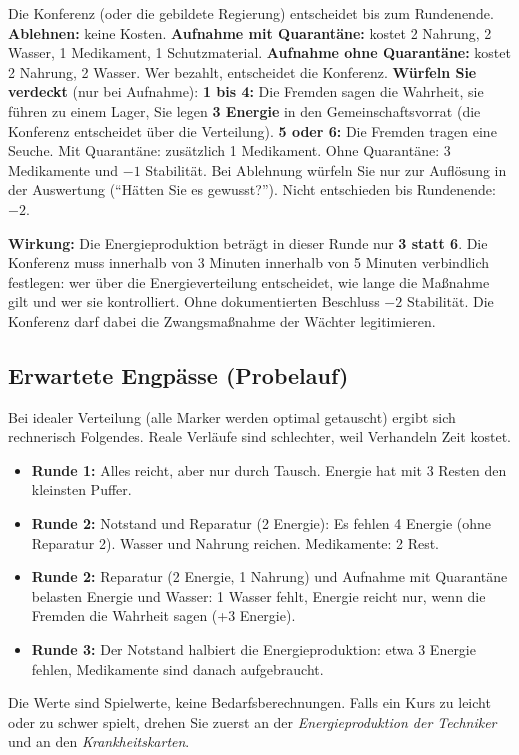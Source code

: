 \ifkurz\else
\begin{eventbox}[title={Ereignis 2: Unbekannte im Tunnel (Runde 2, nach der Regierungsbildung)},fonttitle=\bfseries]
Die Konferenz (oder die gebildete Regierung) entscheidet bis zum Rundenende. \textbf{Ablehnen:} keine Kosten. \textbf{Aufnahme mit Quarantäne:} kostet 2 Nahrung, 2 Wasser, 1 Medikament, 1 Schutzmaterial. \textbf{Aufnahme ohne Quarantäne:} kostet 2 Nahrung, 2 Wasser. Wer bezahlt, entscheidet die Konferenz. \textbf{Würfeln Sie verdeckt} (nur bei Aufnahme): \textbf{1 bis 4:} Die Fremden sagen die Wahrheit, sie führen zu einem Lager, Sie legen \textbf{3 Energie} in den Gemeinschaftsvorrat (die Konferenz entscheidet über die Verteilung). \textbf{5 oder 6:} Die Fremden tragen eine Seuche. Mit Quarantäne: zusätzlich 1 Medikament. Ohne Quarantäne: 3 Medikamente und $-1$ Stabilität. Bei Ablehnung würfeln Sie nur zur Auflösung in der Auswertung (\enquote{Hätten Sie es gewusst?}). Nicht entschieden bis Rundenende: $-2$.
\end{eventbox}
\fi

\begin{eventbox}[title={Ereignis 3: Der Notstand (\ifkurz Runde 2\else Runde 3\fi)},fonttitle=\bfseries]
\textbf{Wirkung:} Die Energieproduktion beträgt in dieser Runde nur \textbf{3 statt 6}. Die Konferenz muss \ifkurz innerhalb von 3 Minuten \else innerhalb von 5 Minuten \fi verbindlich festlegen: wer über die Energieverteilung entscheidet, wie lange die Maßnahme gilt und wer sie kontrolliert. Ohne dokumentierten Beschluss $-2$ Stabilität. Die Konferenz darf dabei die Zwangsmaßnahme der Wächter legitimieren.
\end{eventbox}

\subsection*{Erwartete Engpässe (Probelauf)}
Bei idealer Verteilung (alle Marker werden optimal getauscht) ergibt sich rechnerisch Folgendes. Reale Verläufe sind schlechter, weil Verhandeln Zeit kostet.
\begin{itemize}
  \item \textbf{Runde 1:} Alles reicht, aber nur durch Tausch. Energie hat mit 3 Resten den kleinsten Puffer.
  \ifkurz
  \item \textbf{Runde 2:} Notstand und Reparatur (2 Energie): Es fehlen 4 Energie (ohne Reparatur 2). Wasser und Nahrung reichen. Medikamente: 2 Rest.
  \else
  \item \textbf{Runde 2:} Reparatur (2 Energie, 1 Nahrung) und Aufnahme mit Quarantäne belasten Energie und Wasser: 1 Wasser fehlt, Energie reicht nur, wenn die Fremden die Wahrheit sagen (+3 Energie).
  \item \textbf{Runde 3:} Der Notstand halbiert die Energieproduktion: etwa 3 Energie fehlen, Medikamente sind danach aufgebraucht.
  \fi
\end{itemize}
Die Werte sind Spielwerte, keine Bedarfsberechnungen. Falls ein Kurs zu leicht oder zu schwer spielt, drehen Sie zuerst an der \emph{Energieproduktion der Techniker} und an den \emph{Krankheitskarten}.

